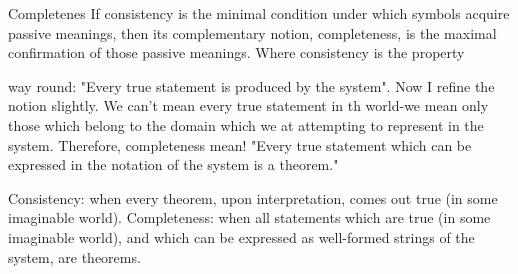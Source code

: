 Completenes If consistency is the minimal condition under which symbols acquire passive meanings, then its complementary notion, completeness, is the maximal confirmation of those passive meanings. Where consistency is the property 







way round: "Every true statement is produced by the system". Now I refine the notion slightly. We can't mean every true statement in th world-we mean only those which belong to the domain which we at attempting to represent in the system. Therefore, completeness mean! "Every true statement which can be expressed in the notation of the system is a theorem." 

Consistency: when every theorem, upon interpretation, comes out true (in some imaginable world). Completeness: when all statements which are true (in some imaginable world), and which can be expressed as well-formed strings of the system, are theorems. 

